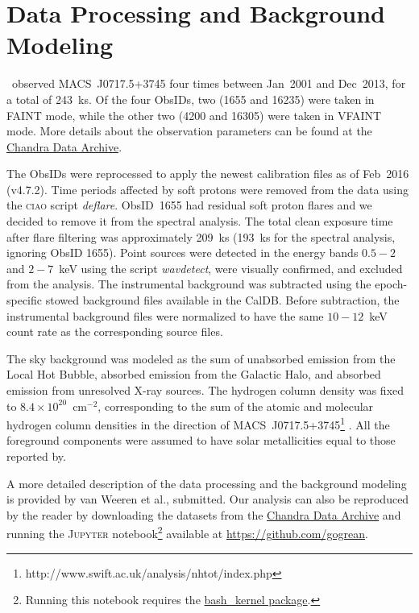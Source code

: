 \section{Data Processing and Background Modeling}
\label{sec:DataAnalysis}

\chandra\ observed MACS~J0717.5+3745 four times between Jan~2001 and Dec~2013, for a total of 243~ks. Of the four ObsIDs, two (1655 and 16235) were taken in FAINT mode, while the other two (4200 and 16305) were taken in VFAINT mode. More details about the observation parameters can be found at the \href{http://cda.harvard.edu/chaser/}{Chandra Data Archive}.

The ObsIDs were reprocessed to apply the newest calibration files as of Feb~2016 (v4.7.2). Time periods affected by soft protons were removed from the data using the \textsc{ciao} script \emph{deflare}. ObsID~1655 had residual soft proton flares and we decided to remove it from the spectral analysis. The total clean exposure time after flare filtering was approximately 209~ks (193~ks for the spectral analysis, ignoring ObsID 1655). Point sources were detected in the energy bands $0.5-2$ and $2-7$~keV using the script \emph{wavdetect}, were visually confirmed, and excluded from the analysis. The instrumental background was subtracted using the epoch-specific stowed background files available in the CalDB. Before subtraction, the instrumental background files were normalized to have the same $10-12$~keV count rate as the corresponding source files. 

The sky background was modeled as the sum of unabsorbed emission from the Local Hot Bubble, absorbed emission from the Galactic Halo, and absorbed emission from unresolved X-ray sources. The hydrogen column density was fixed to $8.4\times 10^{20}$~cm$^{-2}$, corresponding to the sum of the atomic and molecular hydrogen column densities in the direction of MACS~J0717.5+3745\footnote{http://www.swift.ac.uk/analysis/nhtot/index.php} \citep{Kalberla2005, Willingale2013}. All the foreground components were assumed to have solar metallicities equal to those reported by\citet{Feldman1992}. 

A more detailed description of the data processing and the background modeling is provided by van Weeren et al., submitted. Our analysis can also be reproduced by the reader by downloading the datasets from the \href{http://cda.harvard.edu/chaser/}{Chandra Data Archive} and running the \textsc{Jupyter} notebook\footnote{Running this notebook requires the \href{https://github.com/takluyver/bash\_kernel}{bash\_kernel package}.} available at \url{https://github.com/gogrean}. 
